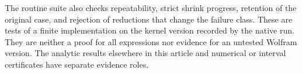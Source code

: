 The routine suite also checks repeatability, strict shrink progress, retention
of the original case, and rejection of reductions that change the failure
class. These are tests of a finite implementation on the kernel version
recorded by the native run. They are neither a proof for all expressions nor
evidence for an untested Wolfram version. The analytic results elsewhere in
this article and numerical or interval certificates have separate evidence
roles.
